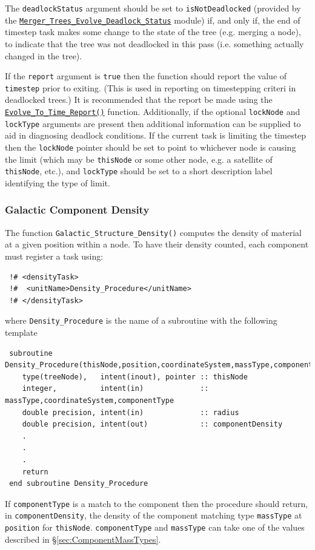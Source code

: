 The {\tt deadlockStatus} argument should be set to {\tt isNotDeadlocked} (provided by the \hyperlink{merger_trees.evolve.deadlock_options.F90:merger_trees_evolve_deadlock_status}{\tt Merger\_Trees\_Evolve\_Deadlock\_Status} module) if, and only if, the end of timestep task makes some change to the state of the tree (e.g. merging a node), to indicate that the tree was not deadlocked in this pass (i.e. something actually changed in the tree).

If the {\tt report} argument is {\tt true} then the function should report the value of {\tt timestep} prior to exiting. (This is used in reporting on timestepping criteri in deadlocked trees.) It is recommended that the report be made using the \hyperlink{merger_trees.evolve.timesteps.report.F90:evolve_to_time_reports:evolve_to_time_report}{\tt Evolve\_To\_Time\_Report()} function. Additionally, if the optional {\tt lockNode} and {\tt lockType} arguments are present then additional information can be supplied to aid in diagnosing deadlock conditions. If the current task is limiting the timestep then the {\tt lockNode} pointer should be set to point to whichever node is causing the limit (which may be {\tt thisNode} or some other node, e.g. a satellite of {\tt thisNode}, etc.), and {\tt lockType} should be set to a short description label identifying the type of limit.

\subsubsection{Galactic Component Density}

The function {\tt Galactic\_Structure\_Density()} computes the density of material at a given position within a node. To have their density counted, each component must register a task using:
\begin{verbatim}
 !# <densityTask>
 !#  <unitName>Density_Procedure</unitName>
 !# </densityTask>
\end{verbatim}
where {\tt Density\_Procedure} is the name of a subroutine with the following template
\begin{verbatim}
 subroutine Density_Procedure(thisNode,position,coordinateSystem,massType,componentType,componentDensity)
    type(treeNode),   intent(inout), pointer :: thisNode
    integer,          intent(in)             :: massType,coordinateSystem,componentType
    double precision, intent(in)             :: radius
    double precision, intent(out)            :: componentDensity
    .
    .
    .
    return
 end subroutine Density_Procedure
\end{verbatim}
If {\tt componentType} is a match to the component then the procedure should return, in {\tt componentDensity}, the density of the component matching type {\tt massType} at {\tt position} for {\tt thisNode}. {\tt componentType} and {\tt massType} can take one of the values described in \S\ref{sec:ComponentMassTypes}.

